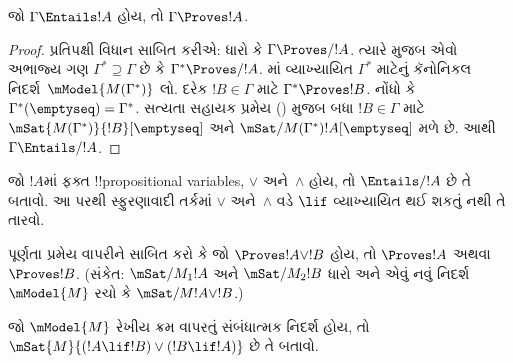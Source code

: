 \documentclass[../../../include/open-logic-section]{subfiles}
\begin{document}


\begin{thm}
  જો $\Gamma \Entails !A$ હોય, તો $\Gamma \Proves !A$.
\end{thm}

\begin{proof}
  પ્રતિપક્ષી વિધાન સાબિત કરીએ: ધારો કે $\Gamma \Proves/ !A$.
  ત્યારે  મુજબ એવો અભાજ્ય ગણ
  $\Gamma^* \supseteq \Gamma$ છે કે $\Gamma^* \Proves/ !A$.
  માં વ્યાખ્યાયિત
  $\Gamma^*$ માટેનું કૅનોનિકલ નિદર્શ~$\mModel{M(\Gamma^*)}$
  લો. દરેક $!B \in \Gamma$ માટે $\Gamma^* \Proves !B$.
  નોંધો કે $\Gamma^*(\emptyseq) = \Gamma^*$.
  સત્યતા સહાયક પ્રમેય () મુજબ
  બધા $!B \in \Gamma$ માટે
  $\mSat{M(\Gamma^*)}{!B}[\emptyseq]$ અને
  $\mSat/{M(\Gamma^*)}{!A}[\emptyseq]$ મળે છે.
  આથી $\Gamma \Entails/ !A$.
\end{proof}

\begin{prob}
  જો $!A$માં ફક્ત !!{propositional variable}s, $\lor$
  અને~$\land$ હોય, તો $\Entails/ !A$ છે તે બતાવો.
  આ પરથી સ્ફુરણાવાદી તર્કમાં $\lor$ અને~$\land$
  વડે $\lif$ વ્યાખ્યાયિત થઈ શકતું નથી તે તારવો.
\end{prob}

\begin{prob}
  પૂર્ણતા પ્રમેય વાપરીને સાબિત કરો કે જો
  $\Proves !A \lor !B$ હોય, તો $\Proves !A$ અથવા
  $\Proves !B$. (સંકેત: $\mSat/{M_1}{!A}$ અને
  $\mSat/{M_2}{!B}$ ધારો અને એવું નવું નિદર્શ
  $\mModel{M}$ રચો કે $\mSat/{M}{!A \lor !B}$.)
\end{prob}

\begin{prob}
  જો $\mModel{M}$ રેખીય ક્રમ વાપરતું સંબંધાત્મક
  નિદર્શ હોય, તો
  $\mSat{M}{(!A \lif !B)\lor(!B \lif !A)}$
  છે તે બતાવો.
\end{prob}
\end{document}
